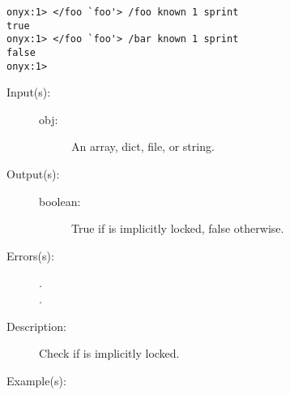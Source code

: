 \begin{description}
\begin{description}
\begin{verbatim}
onyx:1> </foo `foo'> /foo known 1 sprint
true
onyx:1> </foo `foo'> /bar known 1 sprint
false
onyx:1>
		\end{verbatim}
	\end{description}
\label{systemdict:lcheck}
\item[{\onyxop{obj}{lcheck}{boolean}}: ]
	\begin{description}\item[]
	\item[Input(s): ]
		\begin{description}\item[]
		\item[obj: ]
			An array, dict, file, or string.
		\end{description}
	\item[Output(s): ]
		\begin{description}\item[]
		\item[boolean: ]
			True if  is implicitly locked, false
			otherwise.
		\end{description}
	\item[Errors(s): ]
		\begin{description}\item[]
		\item[.]
		\item[.]
		\end{description}
	\item[Description: ]
		Check if  is implicitly locked.
	\item[Example(s): ]\begin{verbatim}


\end{verbatim}
\end{description}
\end{description}

